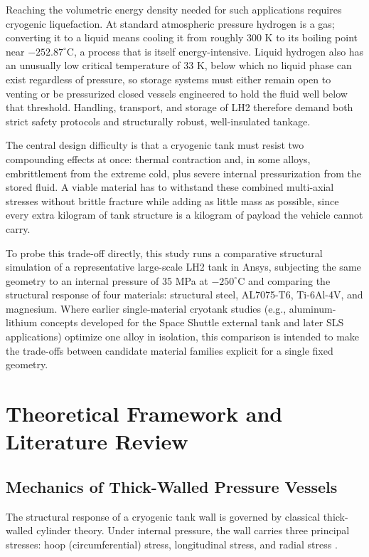 \documentclass[conference]{IEEEtran}
\begin{document}
Reaching the volumetric energy density needed for such applications requires cryogenic liquefaction. At standard atmospheric pressure hydrogen is a gas; converting it to a liquid means cooling it from roughly 300 K to its boiling point near $-252.87^{\circ}$C, a process that is itself energy-intensive. Liquid hydrogen also has an unusually low critical temperature of 33 K, below which no liquid phase can exist regardless of pressure, so storage systems must either remain open to venting or be pressurized closed vessels engineered to hold the fluid well below that threshold. Handling, transport, and storage of LH2 therefore demand both strict safety protocols and structurally robust, well-insulated tankage.

The central design difficulty is that a cryogenic tank must resist two compounding effects at once: thermal contraction and, in some alloys, embrittlement from the extreme cold, plus severe internal pressurization from the stored fluid. A viable material has to withstand these combined multi-axial stresses without brittle fracture while adding as little mass as possible, since every extra kilogram of tank structure is a kilogram of payload the vehicle cannot carry.

To probe this trade-off directly, this study runs a comparative structural simulation of a representative large-scale LH2 tank in Ansys, subjecting the same geometry to an internal pressure of 35 MPa at $-250^{\circ}$C and comparing the structural response of four materials: structural steel, AL7075-T6, Ti-6Al-4V, and magnesium. Where earlier single-material cryotank studies (e.g., aluminum-lithium concepts developed for the Space Shuttle external tank and later SLS applications) optimize one alloy in isolation, this comparison is intended to make the trade-offs between candidate material families explicit for a single fixed geometry.

\section{Theoretical Framework and Literature Review}

\subsection{Mechanics of Thick-Walled Pressure Vessels}
The structural response of a cryogenic tank wall is governed by classical thick-walled cylinder theory. Under internal pressure, the wall carries three principal stresses: hoop (circumferential) stress, longitudinal stress, and radial stress \cite{boresi2003}.
\end{document}
